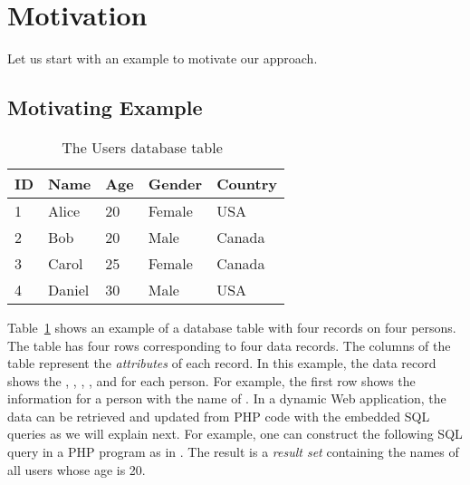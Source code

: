 \section{Motivation}

Let us start with an example to motivate our
approach. 

\subsection{Motivating Example}

\begin{table}
    \centering
    \small
    \caption{The \textsf{Users} database table~\cite{icsm13}}\label{tab:users-table}
\begin{tabular}{lllll}
  \addlinespace
  \toprule
  \textbf{ID} & \textbf{Name} & \textbf{Age} & \textbf{Gender} & \textbf{Country} \\
  \midrule
  1 & Alice & 20 & Female & USA \\
  2 & Bob & 20 & Male & Canada \\
  3 & Carol & 25 & Female & Canada \\
  4 & Daniel & 30 & Male & USA \\
  \bottomrule
\end{tabular}
\end{table}

Table~\ref{tab:users-table} shows an example of a database
table with four records on four persons. The table  has
four rows corresponding to four data records. The columns of the table
represent the {\em attributes} of each record. In this example, the
data record shows the , , ,
, and  for each person. For example, the
first row shows the information for a person with the name of
. In a dynamic Web application, the data can be retrieved
and updated from PHP code with the embedded SQL queries as we will
explain next. For example, one can construct the following SQL query
in a PHP program as in . The result is a {\em result set} containing the names of all
users whose age is 20.


